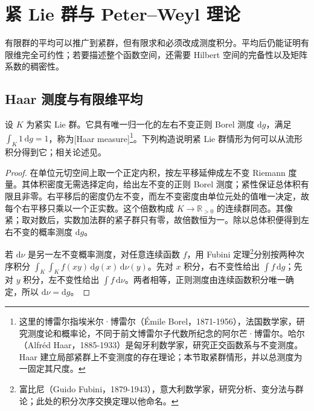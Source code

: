 
\section{紧 Lie 群与 Peter–Weyl 理论}
\label{b5:sec:C02}

%
%

有限群的平均可以推广到紧群，但有限求和必须改成测度积分。平均后仍能证明有限维完全可约性；若要描述整个函数空间，还需要 Hilbert 空间的完备性以及矩阵系数的稠密性。

\subsection{Haar 测度与有限维平均}
\label{b5:subsec:C02:01}

设 \(K\) 为紧实 Lie 群。它具有唯一归一化的左右不变正则 Borel 测度 \(\mathrm{d}g\)，满足 \(\int_K1\,\mathrm{d}g=1\)，称为[Haar measure]\footnote{这里的博雷尔指埃米尔·博雷尔（Émile Borel，1871-1956），法国数学家，研究测度论和概率论，不同于前文博雷尔子代数所纪念的阿尔芒·博雷尔。哈尔（Alfréd Haar，1885-1933）是匈牙利数学家，研究正交函数系与不变测度。Haar 建立局部紧群上不变测度的存在理论；本节取紧群情形，并以总测度为一固定其尺度。}。下列构造说明紧 Lie 群情形为何可以从流形积分得到它；相关论述见\cite[Section 4.6, Theorem 4.36]{Kirillov2008LieGroups}。
\begin{proof}
	在单位元切空间上取一个正定内积，按左平移延伸成左不变 Riemann 度量。其体积密度无需选择定向，给出左不变的正则 Borel 测度；紧性保证总体积有限且非零。右平移后的密度仍左不变，而左不变密度由单位元处的值唯一决定，故每个右平移只乘以一个正实数。这个倍数构成 \(K\to\mathbb R_{>0}\) 的连续群同态。其像紧；取对数后，实数加法群的紧子群只有零，故倍数恒为一。除以总体积便得到左右不变的概率测度 \(\mathrm{d}g\)。

	若 \(\mathrm{d}\nu\) 是另一左不变概率测度，对任意连续函数 \(f\)，用 Fubini 定理\footnote{富比尼（Guido Fubini，1879-1943），意大利数学家，研究分析、变分法与群论；此处的积分次序交换定理以他命名。}分别按两种次序积分 \(\int_K\int_K f(xy)\,\mathrm{d}g(x)\,\mathrm{d}\nu(y)\)。先对 \(x\) 积分，右不变性给出 \(\int f\,\mathrm{d}g\)；先对 \(y\) 积分，左不变性给出 \(\int f\,\mathrm{d}\nu\)。两者相等，正则测度由连续函数积分唯一确定，所以 \(\mathrm{d}\nu=\mathrm{d}g\)。
\end{proof}

